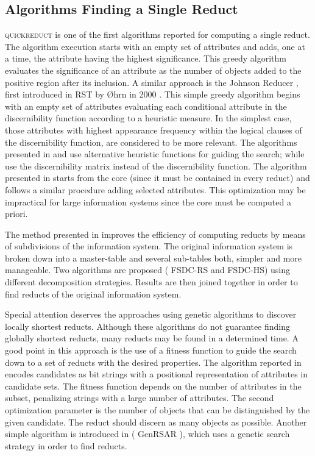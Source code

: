 \documentclass[citenumber]{llncs}
\makeatletter
\newcommand{\setword}[2]{%
  \phantomsection
  #1\def\@currentlabel{\unexpanded{#1}}\label{#2}%
}
\makeatother
\begin{document}
  \subsection{Algorithms Finding a Single Reduct}
  \setword{\textsc{quickreduct}}{quickreduct} \cite{Chouchoulas01} is one of the first algorithms reported for computing a single reduct. The algorithm execution starts with an empty set of attributes and adds, one at a time, the attribute having the highest significance. This greedy algorithm evaluates the significance of an attribute as the number of objects added to the positive region after its inclusion.  A similar approach is the Johnson Reducer \cite{Johnson74}, first introduced in RST by  \O{}hrn in 2000 \cite{Ohrn00}. This simple greedy algorithm begins with an empty set of attributes evaluating each conditional attribute in the discernibility function according to a heuristic measure. In the simplest case, those attributes with highest appearance frequency within the logical clauses of the discernibility function, are considered to be more relevant. The algorithms presented in \cite{Nguyen97} and \cite{Wang01} use alternative heuristic functions for guiding the search; while \cite{Yang08} use the discernibility matrix instead of the discernibility function. The algorithm presented in \cite{Zhong01} starts from the core (since it must be contained in every reduct) and follows a similar procedure adding selected attributes. This optimization may be impractical for large information systems \cite{Jensen14} since the core must be computed a priori.
  
  The method presented in \cite{Jiao10} improves the efficiency of computing reducts by means of subdivisions of the information system. The original information system is broken down into a master-table and several sub-tables both, simpler and more manageable. Two algorithms are proposed (\setword{FSDC-RS}{FSDCRS} and FSDC-HS) using different decomposition strategies. Results are then joined together in order to find reducts of the original information system. 
    
  Special attention deserves the approaches using genetic algorithms to discover locally shortest reducts. Although 
  these algorithms do not guarantee finding globally shortest reducts, many reducts may be found in a determined
  time. A good point in this approach is the use of a fitness function to guide the search down to a set of 
  reducts with the desired properties. The algorithm reported in \cite{Wroblewski95} encodes candidates as bit 
  strings with a positional representation of attributes in candidate sets. The fitness function
  depends on the number of attributes in the subset, penalizing strings with a large number of attributes. The 
  second optimization parameter is the number of objects that can be distinguished by the given candidate. The 
  reduct should discern as many objects as possible. Another simple algorithm is introduced in \cite{Jensen03}  
  (\setword{GenRSAR}{GenRSAR}), which uses a genetic search strategy in order to find reducts.
  
\end{document}
